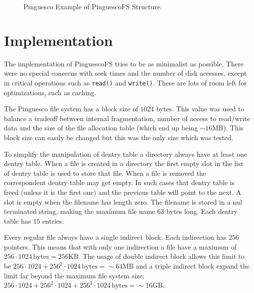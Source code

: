 \documentclass{acm_proc_article-sp}
\newcommand{\pfs}{Pinguesco\xspace}
\newcommand{\pfsfs}{PinguescoFS\xspace}
\begin{document}
\begin{figure}[H]
\begin{center}
    \caption{\pfs Example of \pfsfs Structure.}
    \label{fig:pfsstructex}
  \end{center}
\end{figure}

\section{Implementation}
The implementation of \pfsfs tries to be as minimalist as possible.
There were no special concerns with seek times and the number of
disk accesses, except in critical operations such as \verb|read()|
and \verb|write()|. There are lots of room left for optimizations,
such as caching.

The \pfs file system has a block size of $1024$ bytes. This value
was used to balance a tradeoff between internal fragmentation,
number of access to read/write data and the size of the file allocation 
table (which end up being $\sim16$MB). This block size can easily be
changed but this was the only size which was tested. 

To simplify the manipulation of dentry table a directory always
have at least one dentry table. When a file is created in a directory
the first empty slot in the list of dentry table is used to store
that file. When a file is removed the correspondent dentry table
may get empty. In such cases that dentry table is freed (unless it is the
first one) and the previous table will point to the next. 
A slot is empty when the filename has length zero.
The filename is stored in a nul terminated string, making the maximum
file name $63$ bytes long. Each dentry table has $15$ entries.

Every regular file always have a single indirect block. Each indirection 
has $256$ pointers. This means that with only one indirection a file
have a maximum of $256 \cdot 1024 \, \text{bytes} = 256\text{KB}$.
The usage of double indirect block allows this limit to be 
$256 \cdot 1024 + 256^2 \cdot 1024 \, \text{bytes} = \sim64\text{MB}$
and a triple indirect block expand the limit far beyond the
maximum file system size: 
$256 \cdot 1024 + 256^2 \cdot 1024  + 256^3 \cdot 1024 \, \text{bytes} 
= \sim16\text{GB}$.
\end{document}
